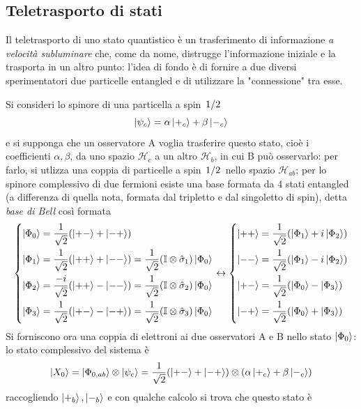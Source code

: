 \subsection{Teletrasporto di stati}
Il teletrasporto di uno stato quantistico è un trasferimento di informazione \textit{a velocità
subluminare} che, come da nome, distrugge l'informazione iniziale e la trasporta in un altro punto:
l'idea di fondo è di fornire a due diversi sperimentatori due particelle entangled e di utilizzare
la "connessione" tra esse.

Si consideri lo spinore di una particella a spin $\flatfrac12$
$$\ket{\psi_c}=\alpha\ket{+_c}+\beta\ket{-_c}$$
e si supponga che un osservatore A voglia trasferire questo stato, cioè i coefficienti
$\alpha,\beta$, da uno spazio $\mathcal{H}_c$ a un altro $\mathcal{H}_b$, in cui B può osservarlo:
per farlo, si utlizza una coppia di particelle a spin $\flatfrac12$ nello spazio $\mathcal{H}_{ab}$;
per lo spinore complessivo di due fermioni esiste una base formata da 4 stati entangled
(a differenza di quella nota, formata dal tripletto e dal singoletto di spin), detta
\textit{base di Bell} così formata
$$
\begin{dcases}
\ket{\Phi_0}=\frac{1}{\sqrt{2}}(\ket{+-}+\ket{-+})\\
\ket{\Phi_1}=\frac{1}{\sqrt{2}}(\ket{++}+\ket{--})=\frac{1}{\sqrt{2}}(\mathbb{I}\otimes\hat\sigma_1)
\ket{\Phi_0}\\
\ket{\Phi_2}=\frac{-i}{\sqrt{2}}(\ket{++}-\ket{--})=\frac{1}{\sqrt{2}}(\mathbb{I}\otimes\hat\sigma_2)
\ket{\Phi_0}\\
\ket{\Phi_3}=\frac{1}{\sqrt{2}}(\ket{+-}-\ket{-+})=\frac{1}{\sqrt{2}}(\mathbb{I}\otimes\hat\sigma_3)
\ket{\Phi_0}
\end{dcases}\leftrightarrow
\begin{dcases}
\ket{++}=\frac{1}{\sqrt{2}}(\ket{\Phi_1}+i\ket{\Phi_2})\\
\ket{--}=\frac{1}{\sqrt{2}}(\ket{\Phi_1}-i\ket{\Phi_2})\\
\ket{+-}=\frac{1}{\sqrt{2}}(\ket{\Phi_0}-\ket{\Phi_3})\\
\ket{-+}=\frac{1}{\sqrt{2}}(\ket{\Phi_0}+\ket{\Phi_3})
\end{dcases}
$$
Si forniscono ora una coppia di elettroni ai due osservatori A e B nello stato $\ket{\Phi_0}$: lo
stato complessivo del sistema è
$$\ket{X_0}=\ket{\Phi_{0,ab}}\otimes\ket{\psi_c}=\frac{1}{\sqrt{2}}(\ket{+-}+\ket{-+})\otimes
(\alpha\ket{+_c}+\beta\ket{-_c})
$$
raccogliendo $\ket{+_b},\ket{-_b}$ e con qualche calcolo si trova che questo stato è
